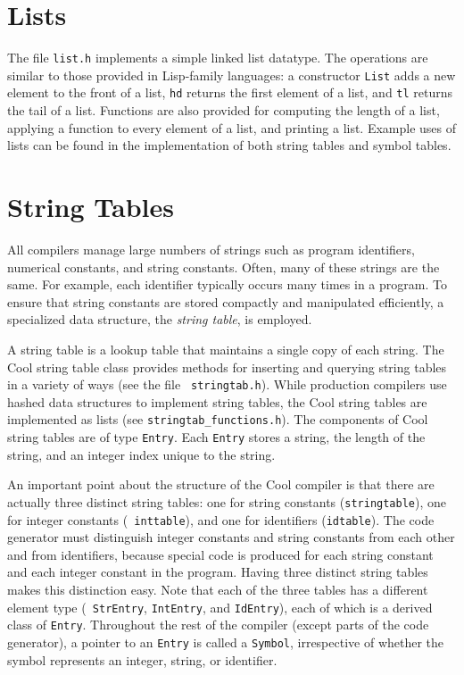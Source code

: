 \section{Lists}

The file {\tt list.h} implements a simple linked list datatype.  The operations
are similar to those provided in Lisp-family languages: a constructor {\tt List}
adds a new element to the front of a list, {\tt hd} returns the first element
of a list, and {\tt tl} returns the tail of a list.  Functions are also
provided for computing the length of a list, applying a function to every
element of a list, and printing a list.
Example uses of lists can be found 
in the implementation of both string tables and symbol tables.

\section{String Tables}

All compilers manage large numbers of strings such as
program identifiers, numerical constants, and string constants.
Often, many of these strings are the same. For example,
each identifier typically occurs many times in a program.
To ensure that string constants are stored compactly and 
manipulated efficiently, a specialized data structure, the
{\em string table}, is employed.

A string table is a lookup table that maintains a single copy of each
string.  The Cool string table class provides methods for inserting
and querying string tables in a variety of ways (see the file {\tt
stringtab.h}).  While production compilers use hashed data structures
to implement string tables, the Cool string tables are implemented
as lists (see {\tt stringtab\_functions.h}).  The components
of Cool string tables are of type {\tt Entry}.  Each {\tt Entry}
stores a string, the length of the string, and an integer index unique
to the string.

An important point about the structure of the Cool compiler is that
there are actually three distinct string tables: one for string
constants ({\tt stringtable}), one for integer constants ({\tt
inttable}), and one for identifiers ({\tt idtable}).  The code
generator must distinguish integer constants and string constants
from each other and from identifiers, because special code is produced
for each string constant and each integer constant in the program.
Having three distinct string tables makes this distinction easy.  Note
that each of the three tables has a different element type ({\tt
StrEntry}, {\tt IntEntry}, and {\tt IdEntry}), each of which is a
derived class of {\tt Entry}.  Throughout the rest of the compiler
(except parts of the code generator), a pointer to an {\tt Entry} is
called a {\tt Symbol}, irrespective of whether the symbol represents
an integer, string, or identifier.


